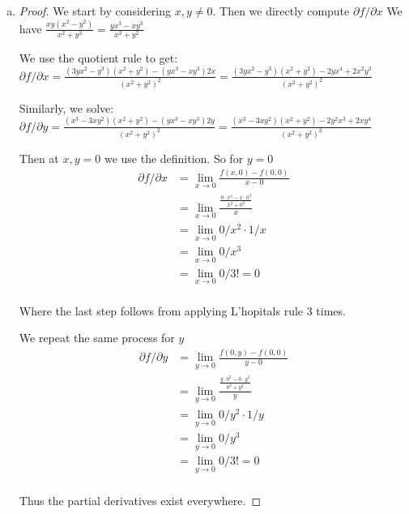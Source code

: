 \documentclass[11pt]{article}
\begin{document}
\begin{enumerate}[(a)]
    \item 
    \begin{proof}
        We start by considering $x, y \neq 0$. Then we directly compute $\partial f / \partial x$
        We have $\frac{xy(x^2-y^2)}{x^2 + y^2} = \frac{yx^3-xy^3}{x^2 + y^2}$

        We use the quotient rule to get: 
        $\partial f / \partial x = \frac{(3yx^2 - y^3)(x^2 + y^2)  - (yx^3-xy^3)2x}{(x^2 + y^2)^2} = \frac{(3yx^2 - y^3)(x^2 + y^2) - 2yx^4+2x^2y^3}{(x^2 + y^2)^2}$

        Similarly, we solve: $\partial f / \partial y = \frac{(x^3 - 3xy^2)(x^2+ y^2) - (yx^3-xy^3)2y}{(x^2 + y^2)^2} = \frac{(x^3 - 3xy^2)(x^2 + y^2) - 2y^2x^3+2xy^4}{(x^2 + y^2)^2}$
        
        Then at $x, y = 0$ we use the definition. 
        So for $y = 0$
        \begin{align*}
            \partial f / \partial x &= \lim_{x \to 0} \frac{f(x,0) - f(0,0)}{x - 0}\\
            &= \lim_{x \to 0} \frac{\frac{0 \cdot x^3-x \cdot 0^3}{x^2 + 0^2}}{x} \\
            &= \lim_{x \to 0} 0/x^2 \cdot 1/x \\
            &= \lim_{x \to 0} 0/x^3 \\
            &=  \lim_{x \to 0} 0/3! = 0 \\
        \end{align*}
        
        Where the last step follows from applying L'hopitals rule 3 times.

        We repeat the same process for $y$
        \begin{align*}
            \partial f / \partial y &= \lim_{y \to 0} \frac{f(0,y) - f(0,0)}{y - 0}\\
            &= \lim_{y \to 0} \frac{\frac{y \cdot 0^3- 0 \cdot y^3}{0^2 + y^2}}{y} \\
            &= \lim_{y \to 0} 0/y^2 \cdot 1/y \\
            &= \lim_{y \to 0} 0/y^3 \\
            &=  \lim_{y \to 0} 0/3! = 0 \\
        \end{align*}

        Thus the partial derivatives exist everywhere.

    \end{proof}







\end{enumerate}
\end{document}
